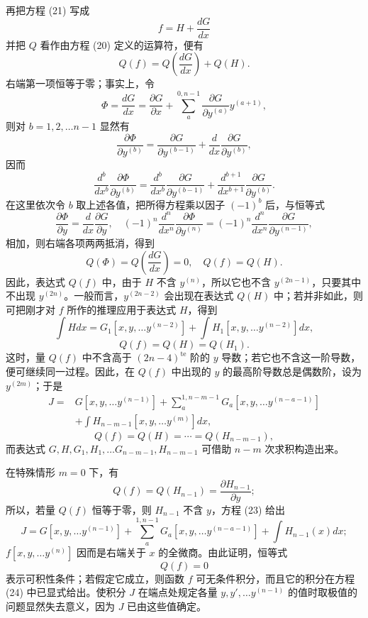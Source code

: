 \documentclass[11pt,a4paper,leqno]{article}
\begin{document}
再把方程 (21) 写成
\[
f=H+\frac{dG}{dx}
\]
并把 $Q$ 看作由方程 (20) 定义的运算符，便有
\[
Q(f)=Q\left(\frac{dG}{dx}\right)+Q(H).
\]
右端第一项恒等于零；事实上，令
\[
\Phi=\frac{dG}{dx}=\frac{\partial G}{\partial x}+\sum_a^{0,n-1}\frac{\partial G}{\partial y^{(a)}}y^{(a+1)},
\]
则对 $b=1,2,\ldots n-1$ 显然有
\[
\frac{\partial\Phi}{\partial y^{(b)}}=\frac{\partial G}{\partial y^{(b-1)}}+\frac{d}{dx}\frac{\partial G}{\partial y^{(b)}},
\]
因而
\[
\frac{d^b}{dx^b}\frac{\partial\Phi}{\partial y^{(b)}}=\frac{d^b}{dx^b}\frac{\partial G}{\partial y^{(b-1)}}+\frac{d^{b+1}}{dx^{b+1}}\frac{\partial G}{\partial y^{(b)}}.
\]
在这里依次令 $b$ 取上述各值，把所得方程乘以因子 $(-1)^b$ 后，与恒等式
\[
\frac{\partial\Phi}{\partial y}=\frac{d}{dx}\frac{\partial G}{\partial y},
\quad
(-1)^n\frac{d^n}{dx^n}\frac{\partial\Phi}{\partial y^{(n)}}=(-1)^n\frac{d^n}{dx^n}\frac{\partial G}{\partial y^{(n-1)}},
\]
相加，则右端各项两两抵消，得到
\begin{equation}\tag{22}
Q(\Phi)=Q\left(\frac{dG}{dx}\right)=0,
\quad
Q(f)=Q(H).
\end{equation}
因此，表达式 $Q(f)$ 中，由于 $H$ 不含 $y^{(n)}$，所以它也不含 $y^{(2n-1)}$，只要其中不出现 $y^{(2n)}$。一般而言，$y^{(2n-2)}$ 会出现在表达式 $Q(H)$ 中；若并非如此，则可把刚才对 $f$ 所作的推理应用于表达式 $H$，得到
\[
\int Hdx=G_1[x,y,\ldots y^{(n-2)}]+\int H_1[x,y,\ldots y^{(n-2)}]dx,
\]
\[
Q(f)=Q(H)=Q(H_1).
\]
这时，量 $Q(f)$ 中不含高于 $(2n-4)^{\mathrm{te}}$ 阶的 $y$ 导数；若它也不含这一阶导数，便可继续同一过程。因此，在 $Q(f)$ 中出现的 $y$ 的最高阶导数总是偶数阶，设为 $y^{(2m)}$；于是
\begin{equation}\tag{23}
\begin{aligned}
J={}&G[x,y,\ldots y^{(n-1)}]+\sum_a^{1,n-m-1}G_a[x,y,\ldots y^{(n-a-1)}] \\
&+\int H_{n-m-1}[x,y,\ldots y^{(m)}]dx,
\end{aligned}
\end{equation}
\[
Q(f)=Q(H)=\cdots=Q(H_{n-m-1}),
\]
而表达式 $G,H,G_1,H_1,\ldots G_{n-m-1},H_{n-m-1}$ 可借助 $n-m$ 次求积构造出来。

在特殊情形 $m=0$ 下，有
\[
Q(f)=Q(H_{n-1})=\frac{\partial H_{n-1}}{\partial y};
\]
所以，若量 $Q(f)$ 恒等于零，则 $H_{n-1}$ 不含 $y$，方程 (23) 给出
\begin{equation}\tag{24}
J=G[x,y,\ldots y^{(n-1)}]+\sum_a^{1,n-1}G_a[x,y,\ldots y^{(n-a-1)}]
+\int H_{n-1}(x)dx;
\end{equation}
$f[x,y,\ldots y^{(n)}]$ 因而是右端关于 $x$ 的全微商。由此证明，恒等式
\begin{equation}\tag{25}
Q(f)=0
\end{equation}
表示可积性条件；若假定它成立，则函数 $f$ 可无条件积分，而且它的积分在方程 (24) 中已显式给出。使积分 $J$ 在端点处规定各量 $y,y',\ldots y^{(n-1)}$ 的值时取极值的问题显然失去意义，因为 $J$ 已由这些值确定。
\end{document}
